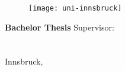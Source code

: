 \frontmatter
\pagestyle{empty}

\begin{titlepage}
	\rule{0mm}{1mm}
	\vspace*{10mm}

	\begin{center}
		\begin{figure}
			\centering
			\texttt{[image: uni-innsbruck]}
		\end{figure}	
		\vskip 25mm
		{\LARGE\textbf{\MTitle}}
		\vskip 5mm
		\vskip 1cm
		{\Large \textbf{\MAuthor}}\vskip 15mm
		\vskip 15mm
		\textbf{\large Bachelor Thesis}    
		\vskip 3cm
		{\large Supervisor:\\}
		{\MSupervisor\\}
		{\large \MInstitution\\}
		{\large \MOrg}    
		\vfill
		{\large Innsbruck, \MDate} 
	\end{center}
\end{titlepage}

\ClearShipoutPicture
